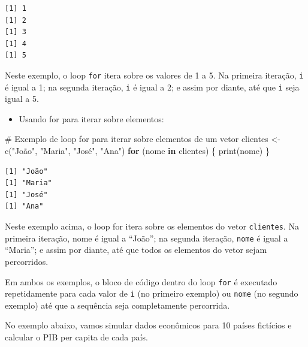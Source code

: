 \documentclass[
  portuguese,
  letterpaper,
  DIV=11,
  numbers=noendperiod]{scrreprt}
\newenvironment{Shaded}{\begin{snugshade}}{\end{snugshade}}
\newcommand{\CommentTok}[1]{\textcolor[rgb]{0.37,0.37,0.37}{#1}}
\newcommand{\ControlFlowTok}[1]{\textcolor[rgb]{0.00,0.23,0.31}{\textbf{#1}}}
\newcommand{\FunctionTok}[1]{\textcolor[rgb]{0.28,0.35,0.67}{#1}}
\newcommand{\NormalTok}[1]{\textcolor[rgb]{0.00,0.23,0.31}{#1}}
\newcommand{\OtherTok}[1]{\textcolor[rgb]{0.00,0.23,0.31}{#1}}
\newcommand{\StringTok}[1]{\textcolor[rgb]{0.13,0.47,0.30}{#1}}
\providecommand{\tightlist}{%
  \setlength{\itemsep}{0pt}\setlength{\parskip}{0pt}}
\theoremstyle{definition}
\theoremstyle{remark}
\begin{document}
\begin{verbatim}
[1] 1
[1] 2
[1] 3
[1] 4
[1] 5
\end{verbatim}

Neste exemplo, o loop \texttt{for} itera sobre os valores de 1 a 5. Na
primeira iteração, \texttt{i} é igual a 1; na segunda iteração,
\texttt{i} é igual a 2; e assim por diante, até que \texttt{i} seja
igual a 5.

\begin{itemize}
\tightlist
\item
  Usando for para iterar sobre elementos:
\end{itemize}

\begin{Shaded}
\begin{Highlighting}[]
\CommentTok{\# Exemplo de loop for para iterar sobre elementos de um vetor}
\NormalTok{clientes }\OtherTok{\textless{}{-}} \FunctionTok{c}\NormalTok{(}\StringTok{"João"}\NormalTok{, }\StringTok{"Maria"}\NormalTok{, }\StringTok{"José"}\NormalTok{, }\StringTok{"Ana"}\NormalTok{)}
\ControlFlowTok{for}\NormalTok{ (nome }\ControlFlowTok{in}\NormalTok{ clientes) \{}
  \FunctionTok{print}\NormalTok{(nome)}
\NormalTok{\}}
\end{Highlighting}
\end{Shaded}

\begin{verbatim}
[1] "João"
[1] "Maria"
[1] "José"
[1] "Ana"
\end{verbatim}

Neste exemplo acima, o loop for itera sobre os elementos do vetor
\texttt{clientes}. Na primeira iteração, nome é igual a ``João''; na
segunda iteração, \texttt{nome} é igual a ``Maria''; e assim por diante,
até que todos os elementos do vetor sejam percorridos.

Em ambos os exemplos, o bloco de código dentro do loop \texttt{for} é
executado repetidamente para cada valor de \texttt{i} (no primeiro
exemplo) ou \texttt{nome} (no segundo exemplo) até que a sequência seja
completamente percorrida.

No exemplo abaixo, vamos simular dados econômicos para 10 países
fictícios e calcular o PIB per capita de cada país.
\end{document}
